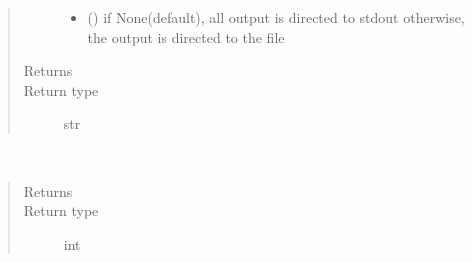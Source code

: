 \documentclass[letterpaper,10pt,english]{sphinxmanual}
\begin{document}
\begin{fulllineitems}
\begin{fulllineitems}
\begin{quote}
\begin{description}
\begin{itemize}
\item {} 
 () \textendash{} if None(default), all output is directed to stdout 
otherwise, the output is directed to the file

\end{itemize}

\item[{Returns}] \leavevmode
{}

\item[{Return type}] \leavevmode
str

\end{description}\end{quote}

\end{fulllineitems}


\begin{fulllineitems}
\label{\detokenize{Reference:salabim.Poisson.sample}}~\begin{quote}\begin{description}
\item[{Returns}] \leavevmode
{}

\item[{Return type}] \leavevmode
int

\end{description}\end{quote}

\end{fulllineitems}


\end{fulllineitems}

\end{document}
